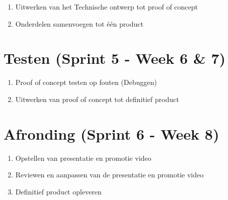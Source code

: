 \begin{enumerate}
  \item Uitwerken van het Technische ontwerp tot proof of concept
  \item Onderdelen samenvoegen tot één product
\end{enumerate}

\section{Testen (Sprint 5 - Week 6 & 7)} \label{subsec:Testen (Sprint 5 - Week 6 & 7)}

\begin{enumerate}
  \item Proof of concept testen op fouten (Debuggen)
  \item Uitwerken van proof of concept tot definitief product
\end{enumerate}

\section{Afronding (Sprint 6 - Week 8)} \label{subsec:Afronding (Sprint 6 - Week 8)}

\begin{enumerate}
  \item Opstellen van presentatie en promotie video
  \item Reviewen en aanpassen van de presentatie en promotie video
  \item Definitief product opleveren
\end{enumerate}